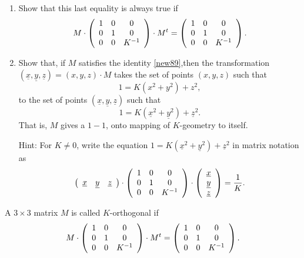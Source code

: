 \documentclass{ximera}
\begin{document}
\begin{exercise}\hfil
\label{87}
\begin{enumerate}
\item  Show that this last equality is always true if%
\begin{equation}
M\cdot\left(
\begin{array}
[c]{ccc}%
1 & 0 & 0\\
0 & 1 & 0\\
0 & 0 & K^{-1}%
\end{array}
\right)  \cdot M^{t}=\left(
\begin{array}
[c]{ccc}%
1 & 0 & 0\\
0 & 1 & 0\\
0 & 0 & K^{-1}%
\end{array}
\right)  . \label{new89}%
\end{equation}

\item Show that, if $M$ satisfies the identity \ref{new89},then the
transformation $\left(  \underline{x},\underline{y},\underline{z}\right)
=\left(  x,y,z\right)  \cdot M$ takes the set of points $\left(  x,y,z\right)
$ such that%
\[
1=K\left(  x^{2}+y^{2}\right)  +z^{2},
\]
to the set of points $\left(  \underline{x},\underline{y},\underline
{z}\right)  $ such that%
\[
1=K\left(  \underline{x}^{2}+\underline{y}^{2}\right)  +\underline{z}^{2}.
\]
That is, $M$ gives a $1-1$, onto mapping of $K$-geometry to itself.

Hint: For $K\neq0$, write the equation $1=K\left(  \underline{x}%
^{2}+\underline{y}^{2}\right)  +\underline{z}^{2}$ in matrix notation as%
\[
\left(
\begin{array}
[c]{ccc}%
\underline{x} & \underline{y} & \underline{z}%
\end{array}
\right)  \cdot\left(
\begin{array}
[c]{ccc}%
1 & 0 & 0\\
0 & 1 & 0\\
0 & 0 & K^{-1}%
\end{array}
\right)  \cdot\left(
\begin{array}
[c]{c}%
\underline{x}\\
\underline{y}\\
\underline{z}%
\end{array}
\right)  =\frac{1}{K}.
\]
\end{enumerate}
\end{exercise}

\begin{definition}
\label{88}A $3\times3$ matrix $M$ is called $K$-orthogonal if
\[
M\cdot\left(
\begin{array}
[c]{ccc}%
1 & 0 & 0\\
0 & 1 & 0\\
0 & 0 & K^{-1}%
\end{array}
\right)  \cdot M^{t}=\left(
\begin{array}
[c]{ccc}%
1 & 0 & 0\\
0 & 1 & 0\\
0 & 0 & K^{-1}%
\end{array}
\right)  .
\]

\end{definition}
\end{document}
